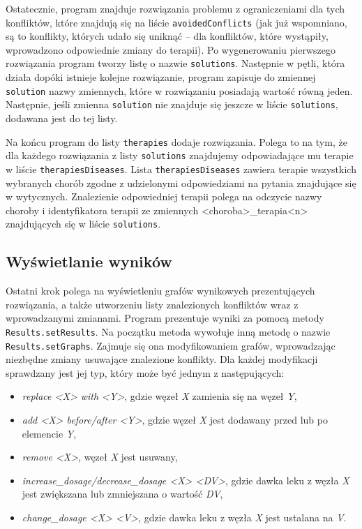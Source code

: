 Ostatecznie, program znajduje rozwiązania problemu z ograniczeniami dla tych konfliktów, które znajdują się na liście \texttt{avoidedConflicts} (jak już wspomniano, są to konflikty, których udało się uniknąć -- dla konfliktów, które wystąpiły, wprowadzono odpowiednie zmiany do terapii). Po wygenerowaniu pierwszego rozwiązania program tworzy listę o nazwie \texttt{solutions}. Następnie w pętli, która działa dopóki istnieje kolejne rozwiązanie, program zapisuje do zmiennej \texttt{solution} nazwy zmiennych, które w rozwiązaniu posiadają wartość równą jeden. Następnie, jeśli zmienna \texttt{solution} nie znajduje się jeszcze w liście \texttt{solutions}, dodawana jest do tej listy. 

Na końcu program do listy \texttt{therapies} dodaje rozwiązania. Polega to na tym, że dla każdego rozwiązania z listy \texttt{solutions} znajdujemy odpowiadające mu terapie w liście \texttt{therapiesDiseases}. Lista \texttt{therapiesDiseases} zawiera terapie wszystkich wybranych chorób zgodne z udzielonymi odpowiedziami na pytania znajdujące się w wytycznych. Znalezienie odpowiedniej terapii polega na odczycie nazwy choroby i identyfikatora terapii ze zmiennych <choroba>\_terapia<n> znajdujących się w liście \texttt{solutions}.

\subsection{Wyświetlanie wyników}
\label{sect:revisions}
Ostatni krok polega na wyświetleniu grafów wynikowych prezentujących rozwiązania, a także utworzeniu listy znalezionych konfliktów wraz z wprowadzanymi zmianami. Program prezentuje wyniki za pomocą metody \texttt{Results.setResults}. Na początku metoda wywołuje inną metodę o nazwie \texttt{Results.setGraphs}. Zajmuje się ona modyfikowaniem grafów, wprowadzając niezbędne zmiany usuwające znalezione konflikty.
Dla każdej modyfikacji sprawdzany jest jej typ, który może być jednym z następujących:
\begin{itemize}
\item \textit{replace <X> with <Y>}, gdzie węzeł \textit{X} zamienia się na węzeł \textit{Y},
\item \textit{add <X> before/after <Y>}, gdzie węzeł \textit{X} jest dodawany przed lub po elemencie \textit{Y},
\item \textit{remove <X>}, węzeł \textit{X} jest usuwany,
\item \textit{increase\_dosage/decrease\_dosage <X> <DV>}, gdzie dawka leku z węzła \textit{X} jest zwiększana lub zmniejszana o wartość \textit{DV},
\item \textit{change\_dosage <X> <V>}, gdzie dawka leku z węzła \textit{X} jest ustalana na \textit{V}.  
\end{itemize}

